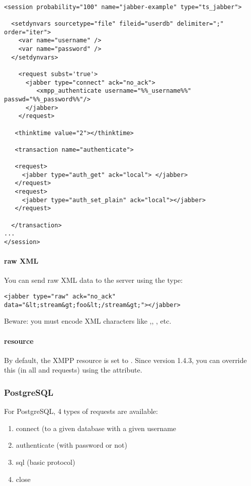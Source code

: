 \documentclass{TSUNG-en}
\begin{document}
\begin{Verbatim}

<session probability="100" name="jabber-example" type="ts_jabber">

  <setdynvars sourcetype="file" fileid="userdb" delimiter=";" order="iter">
    <var name="username" />
    <var name="password" />
  </setdynvars>

    <request subst='true'>
      <jabber type="connect" ack="no_ack">
         <xmpp_authenticate username="%%_username%%" passwd="%%_password%%"/>
      </jabber>
    </request>

   <thinktime value="2"></thinktime>

   <transaction name="authenticate">

   <request>
     <jabber type="auth_get" ack="local"> </jabber>
   </request>
   <request>
     <jabber type="auth_set_plain" ack="local"></jabber>
   </request>

  </transaction>
...
</session>
\end{Verbatim}

\paragraph{raw XML}
You can send raw XML data to the server using the  type:
\begin{Verbatim}
<jabber type="raw" ack="no_ack" data="&lt;stream&gt;foo&lt;/stream&gt;"></jabber>
\end{Verbatim}

Beware: you must encode XML characters like \userinput{<}
,\userinput{>}, \userinput{\&}, etc.

\paragraph{resource}

By default, the XMPP resource is set to . Since
version 1.4.3, you can override this (in all  and
 requests) using the  attribute.

\subsubsection{PostgreSQL}

For PostgreSQL, 4 types of requests are available:
\begin{enumerate}
\item connect (to a given database with a given username
\item authenticate (with password or not)
\item sql (basic protocol)
\item close
\end{enumerate}
\end{document}
